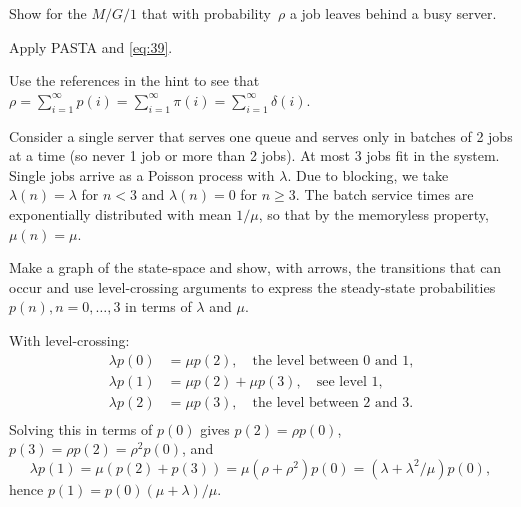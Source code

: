 \documentclass[stochastic-or.tex]{subfiles}
\begin{document}
\begin{exercise}\label{ex:28}
Show for the $M/G/1$  that  with probability~$\rho$ a job leaves behind a busy server.
\begin{hint}
 Apply PASTA and \cref{eq:39}.
\end{hint}
\begin{solution}
Use the references in  the hint to see that
$\rho = \sum_{i=1}^\infty p(i) = \sum_{i=1}^\infty \pi(i) = \sum_{i=1}^\infty \delta(i)$.
\end{solution}
\end{exercise}


\begin{exercise}\label{ex:67}
Consider a single server that serves one queue and serves only in batches of 2 jobs at a time (so never 1 job or more than 2 jobs).
At most 3 jobs fit in the system.
Single jobs arrive as a Poisson process with $\lambda$.
Due to blocking, we take $\lambda(n) = \lambda$ for $n<3$ and $\lambda(n)=0$ for $n\geq 3$.
The batch service times are exponentially distributed with mean $1/\mu$, so that by the memoryless property, $\mu(n) = \mu$.

Make a graph of the state-space and show, with arrows, the transitions that can occur and  use level-crossing arguments to express the steady-state probabilities $p(n), n=0,\ldots, 3$ in terms of $\lambda$ and $\mu$.
\begin{solution}


With level-crossing:
 \begin{align*}
 \lambda p(0) &= \mu p(2), \quad\text{the level between 0 and 1,}\\
 \lambda p(1) &= \mu p(2) +\mu p(3), \quad\text{see level 1,}\\
 \lambda p(2) &= \mu p(3), \quad\text{the level between 2 and 3.}\\
 \end{align*}
 Solving this in terms of $p(0)$ gives $p(2) = \rho p(0)$, $p(3) = \rho p(2) = \rho^2p(0)$, and
 \begin{equation*}
 \lambda p(1) = \mu(p(2) + p(3)) = \mu (\rho + \rho^2) p(0) = (\lambda + \lambda^2/\mu) p(0),
 \end{equation*}
hence $p(1) = p(0)(\mu + \lambda)/\mu$.
\end{solution}
\end{exercise}
\end{document}

